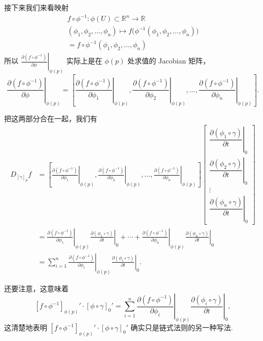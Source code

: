接下来我们来看映射
\[
\begin{array}{c}
f\circ\phi^{-1}:\phi(U)\subset\mathbb{R}^n\longrightarrow\mathbb{R}\\
(\phi_1,\phi_2,\ldots,\phi_n)\longmapsto f\bigl(\phi^{-1}(\phi_1,\phi_2,\ldots,\phi_n)\bigr)\\
=f\circ\phi^{-1}(\phi_1,\phi_2,\ldots,\phi_n)
\end{array}
\]
所以 $\left.\frac{\partial(f\circ\phi^{-1})}{\partial\phi}\right|_{\phi(p)}$ 实际上是在 $\phi(p)$ 处求值的 Jacobian 矩阵，
\[
\left.\frac{\partial(f\circ\phi^{-1})}{\partial\phi}\right|_{\phi(p)}=\left[\left.\frac{\partial(f\circ\phi^{-1})}{\partial\phi_1}\right|_{\phi(p)},\left.\frac{\partial(f\circ\phi^{-1})}{\partial\phi_2}\right|_{\phi(p)},\ldots,\left.\frac{\partial(f\circ\phi^{-1})}{\partial\phi_n}\right|_{\phi(p)}\right].
\]

把这两部分合在一起，我们有
\[
\begin{aligned}
D_{[\gamma]_p}f&=\left[\left.\frac{\partial(f\circ\phi^{-1})}{\partial\phi_1}\right|_{\phi(p)},\left.\frac{\partial(f\circ\phi^{-1})}{\partial\phi_2}\right|_{\phi(p)},\ldots,\left.\frac{\partial(f\circ\phi^{-1})}{\partial\phi_n}\right|_{\phi(p)}\right]\begin{bmatrix}\left.\dfrac{\partial(\phi_1\circ\gamma)}{\partial t}\right|_0\\[1.2em] \left.\dfrac{\partial(\phi_2\circ\gamma)}{\partial t}\right|_0\\[1.2em] \vdots\\[0.6em] \left.\dfrac{\partial(\phi_n\circ\gamma)}{\partial t}\right|_0\end{bmatrix}\\
&=\left.\frac{\partial(f\circ\phi^{-1})}{\partial\phi_1}\right|_{\phi(p)}\left.\frac{\partial(\phi_1\circ\gamma)}{\partial t}\right|_0+\cdots+\left.\frac{\partial(f\circ\phi^{-1})}{\partial\phi_n}\right|_{\phi(p)}\left.\frac{\partial(\phi_n\circ\gamma)}{\partial t}\right|_0\\
&=\sum_{i=1}^{n}\left.\frac{\partial(f\circ\phi^{-1})}{\partial\phi_i}\right|_{\phi(p)}\left.\frac{\partial(\phi_i\circ\gamma)}{\partial t}\right|_0.
\end{aligned}
\]

还要注意，这意味着
\[
[f\circ\phi^{-1}]_{\phi(p)}'\cdot[\phi\circ\gamma]_0'=\sum_{i=1}^{n}\left.\frac{\partial(f\circ\phi^{-1})}{\partial\phi_i}\right|_{\phi(p)}\left.\frac{\partial(\phi_i\circ\gamma)}{\partial t}\right|_0,
\]
这清楚地表明 $[f\circ\phi^{-1}]_{\phi(p)}'\cdot[\phi\circ\gamma]_0'$ 确实只是链式法则的另一种写法.

